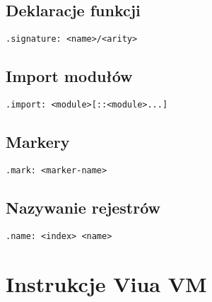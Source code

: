 \subsection{Deklaracje funkcji}

\begin{lstlisting}
.signature: <name>/<arity>
\end{lstlisting}

\subsection{Import modułów}

\begin{lstlisting}
.import: <module>[::<module>...]
\end{lstlisting}

\subsection{Markery}

\begin{lstlisting}
.mark: <marker-name>
\end{lstlisting}

\subsection{Nazywanie rejestrów}

\begin{lstlisting}
.name: <index> <name>
\end{lstlisting}

\section{Instrukcje Viua VM}















